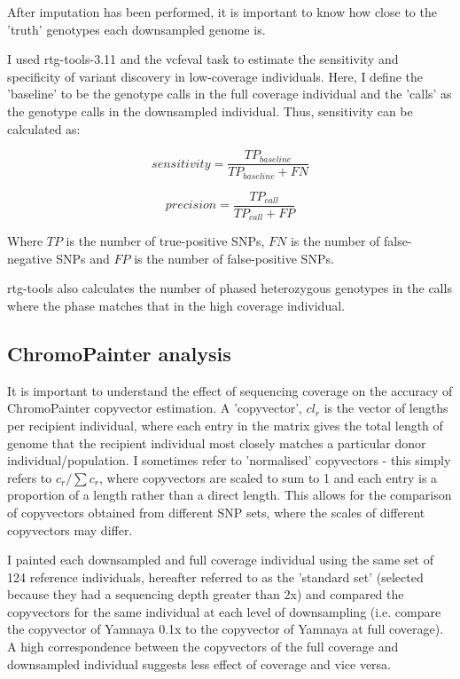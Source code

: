 After imputation has been performed, it is important to know how close to the 'truth' genotypes each downsampled genome is. 

I used rtg-tools-3.11 \cite{cleary2014joint} and the vcfeval task to estimate the sensitivity and specificity of variant discovery in low-coverage individuals. Here, I define the 'baseline' to be the genotype calls in the full coverage individual and the 'calls' as the genotype calls in the downsampled individual. Thus, sensitivity can be calculated as: 

\begin{equation}
sensitivity = \frac{TP_{baseline}}{TP_{baseline} + FN}
\end{equation}

\begin{equation}
precision = \frac{TP_{call}}{TP_{call} + FP}
\end{equation}

Where $TP$ is the number of true-positive SNPs, $FN$ is the number of false-negative SNPs and $FP$ is the number of false-positive SNPs. 

rtg-tools also calculates the number of phased heterozygous genotypes in the calls where the phase matches that in the high coverage individual. 


\subsection{ChromoPainter analysis} \label{ChromoPainter_analysis}

It is important to understand the effect of sequencing coverage on the accuracy of ChromoPainter copyvector estimation. A 'copyvector', $cl_{r}$ is the vector of lengths per recipient individual, where each entry in the matrix gives the total length of genome that the recipient individual most closely matches a particular donor individual/population. I sometimes refer to 'normalised' copyvectors - this simply refers to $c_{r} / \sum c_{r}$, where copyvectors are scaled to sum to 1 and each entry is a proportion of a length rather than a direct length. This allows for the comparison of copyvectors obtained from different SNP sets, where the scales of different copyvectors may differ.

I painted each downsampled and full coverage individual using the same set of 124 reference individuals, hereafter referred to as the 'standard set' (selected because they had a sequencing depth greater than 2x) and compared the copyvectors for the same individual at each level of downsampling (i.e. compare the copyvector of Yamnaya 0.1x to the copyvector of Yamnaya at full coverage). A high correspondence between the copyvectors of the full coverage and downsampled individual suggests less effect of coverage and vice versa. 

